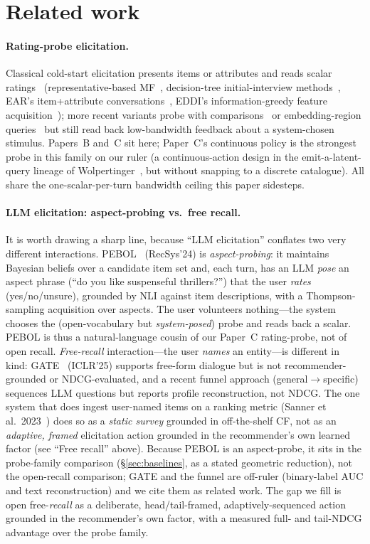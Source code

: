 \documentclass[11pt]{article}
\begin{document}
\section{Related work}
\label{sec:related}
\paragraph{Rating-probe elicitation.} Classical cold-start elicitation presents items or attributes and reads scalar
ratings~\cite{rashid02,rashid08} (representative-based MF~\cite{rbmf}, decision-tree initial-interview
methods~\cite{golbandi11}, EAR's item+attribute conversations~\cite{lei20ear}, EDDI's
information-greedy feature acquisition~\cite{eddi}); more recent variants probe with comparisons~\cite{xie21} or
embedding-region queries~\cite{nguyen24} but still read back low-bandwidth feedback about a system-chosen stimulus.
Papers~B and~C sit here; Paper~C's continuous policy is the strongest probe in
this family on our ruler (a continuous-action design in the emit-a-latent-query lineage of
Wolpertinger~\cite{wolpertinger}, but without snapping to a discrete catalogue). All share the one-scalar-per-turn
bandwidth ceiling this paper sidesteps.

\paragraph{LLM elicitation: aspect-probing vs.\ free recall.} It is worth drawing a sharp line, because ``LLM
elicitation'' conflates two very different interactions. PEBOL~\cite{pebol} (RecSys'24) is \emph{aspect-probing}: it maintains
Bayesian beliefs over a candidate item set and, each turn, has an LLM \emph{pose} an aspect phrase (``do you like
suspenseful thrillers?'') that the user \emph{rates} (yes/no/unsure), grounded by NLI against item descriptions, with a
Thompson-sampling acquisition over aspects. The user volunteers nothing---the system chooses the (open-vocabulary but
\emph{system-posed}) probe and reads back a scalar. PEBOL is thus a natural-language cousin of our Paper~C rating-probe,
not of open recall. \emph{Free-recall} interaction---the user \emph{names} an entity---is different in kind: GATE~\cite{gate}
(ICLR'25) supports free-form dialogue but is not recommender-grounded or NDCG-evaluated, and a recent funnel approach
(general$\to$specific)~\cite{montazeralghaem25} sequences LLM questions but reports profile reconstruction, not NDCG. The one system that does ingest user-named items on a ranking metric (Sanner et al.\ 2023~\cite{sanner23}) does so as a
\emph{static survey} grounded in off-the-shelf CF, not as an \emph{adaptive, framed} elicitation action grounded in the
recommender's own learned factor (see ``Free recall'' above). Because PEBOL is an aspect-probe, it sits in the
probe-family comparison (\S\ref{sec:baselines}, as a stated geometric reduction), not the open-recall comparison; GATE
and the funnel are off-ruler (binary-label AUC and text reconstruction) and we cite them as related work. The gap we fill
is open free-\emph{recall} as a deliberate, head/tail-framed, adaptively-sequenced action grounded in the recommender's
own factor, with a measured full- and tail-NDCG advantage over the probe family.
\end{document}
